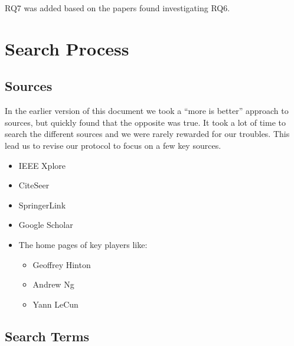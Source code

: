 \documentclass[11pt]{article}
\begin{document}
RQ7 was added based on the papers found investigating RQ6.

\section{Search Process}

\subsection{Sources}

In the earlier version of this document we took a ``more is better'' approach to sources, but quickly found that the opposite was true.  It took a lot of time to search the different sources and we were rarely rewarded for our troubles.  This lead us to revise our protocol to focus on a few key sources.

\begin{itemize}
 \item IEEE Xplore
 \item CiteSeer
 \item SpringerLink
 \item Google Scholar
 \item The home pages of key players like:
   \begin{itemize}
   \item Geoffrey Hinton
   \item Andrew Ng
   \item Yann LeCun
   \end{itemize}
\end{itemize}

\subsection{Search Terms}
\end{document}
